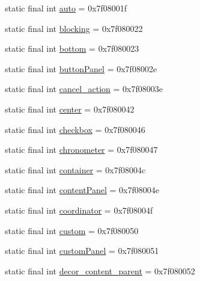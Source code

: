 \begin{DoxyCompactItemize}
static final int \mbox{\hyperlink{classandroid_1_1support_1_1design_1_1_r_1_1id_a425fdc3ba2fac6cb061ce14b2a605caf}{auto}} = 0x7f08001f
\item 
static final int \mbox{\hyperlink{classandroid_1_1support_1_1design_1_1_r_1_1id_a6505e8df123ea2e548a5d6ea4ff3c461}{blocking}} = 0x7f080022
\item 
static final int \mbox{\hyperlink{classandroid_1_1support_1_1design_1_1_r_1_1id_a79e61e6085c198377d3f88b7fd07fd77}{bottom}} = 0x7f080023
\item 
static final int \mbox{\hyperlink{classandroid_1_1support_1_1design_1_1_r_1_1id_acf364991cf5b4d5eab5726ffc663b9fe}{button\+Panel}} = 0x7f08002e
\item 
static final int \mbox{\hyperlink{classandroid_1_1support_1_1design_1_1_r_1_1id_a846a5d8adf38692244186015845064be}{cancel\+\_\+action}} = 0x7f08003e
\item 
static final int \mbox{\hyperlink{classandroid_1_1support_1_1design_1_1_r_1_1id_a8200e2d654b985ad1e81630039ed9c77}{center}} = 0x7f080042
\item 
static final int \mbox{\hyperlink{classandroid_1_1support_1_1design_1_1_r_1_1id_a83a2c2d0d9633468d1c4eae1e4e3c866}{checkbox}} = 0x7f080046
\item 
static final int \mbox{\hyperlink{classandroid_1_1support_1_1design_1_1_r_1_1id_ae85ae29fcbf218c6cc3f47c33466f9e5}{chronometer}} = 0x7f080047
\item 
static final int \mbox{\hyperlink{classandroid_1_1support_1_1design_1_1_r_1_1id_afb9511dea6949b04c835cccea1724f2d}{container}} = 0x7f08004c
\item 
static final int \mbox{\hyperlink{classandroid_1_1support_1_1design_1_1_r_1_1id_af8147990137f41589ca326c6cffc4243}{content\+Panel}} = 0x7f08004e
\item 
static final int \mbox{\hyperlink{classandroid_1_1support_1_1design_1_1_r_1_1id_a2b62305c4c2ed96abd7f329cd9cedd65}{coordinator}} = 0x7f08004f
\item 
static final int \mbox{\hyperlink{classandroid_1_1support_1_1design_1_1_r_1_1id_a5e6da517eb0f33a54612c6496f88ba82}{custom}} = 0x7f080050
\item 
static final int \mbox{\hyperlink{classandroid_1_1support_1_1design_1_1_r_1_1id_ae72fd9603fa648f454993b341554eb57}{custom\+Panel}} = 0x7f080051
\item 
static final int \mbox{\hyperlink{classandroid_1_1support_1_1design_1_1_r_1_1id_a7a500f63633e64805d62d6c01d124d47}{decor\+\_\+content\+\_\+parent}} = 0x7f080052

\end{DoxyCompactItemize}
